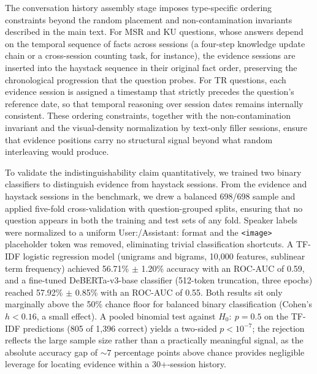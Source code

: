 \documentclass{article}
\begin{document}
The conversation history assembly stage imposes type-specific ordering constraints beyond the random placement and non-contamination invariants described in the main text. For MSR and KU questions, whose answers depend on the temporal sequence of facts across sessions (a four-step knowledge update chain or a cross-session counting task, for instance), the evidence sessions are inserted into the haystack sequence in their original fact order, preserving the chronological progression that the question probes. For TR questions, each evidence session is assigned a timestamp that strictly precedes the question's reference date, so that temporal reasoning over session dates remains internally consistent. These ordering constraints, together with the non-contamination invariant and the visual-density normalization by text-only filler sessions, ensure that evidence positions carry no structural signal beyond what random interleaving would produce.

To validate the indistinguishability claim quantitatively, we trained two binary classifiers to distinguish evidence from haystack sessions. From the evidence and haystack sessions in the benchmark, we drew a balanced 698/698 sample and applied five-fold cross-validation with question-grouped splits, ensuring that no question appears in both the training and test sets of any fold. Speaker labels were normalized to a uniform User:/Assistant: format and the \texttt{<image>} placeholder token was removed, eliminating trivial classification shortcuts. A TF-IDF logistic regression model (unigrams and bigrams, 10{,}000 features, sublinear term frequency) achieved 56.71\% $\pm$ 1.20\% accuracy with an ROC-AUC of 0.59, and a fine-tuned DeBERTa-v3-base classifier (512-token truncation, three epochs) reached 57.92\% $\pm$ 0.85\% with an ROC-AUC of 0.55. Both results sit only marginally above the 50\% chance floor for balanced binary classification (Cohen's $h < 0.16$, a small effect). A pooled binomial test against $H_0{:}~p = 0.5$ on the TF-IDF predictions (805 of 1{,}396 correct) yields a two-sided $p < 10^{-7}$; the rejection reflects the large sample size rather than a practically meaningful signal, as the absolute accuracy gap of ${\sim}7$ percentage points above chance provides negligible leverage for locating evidence within a 30{+}-session history.
\end{document}
